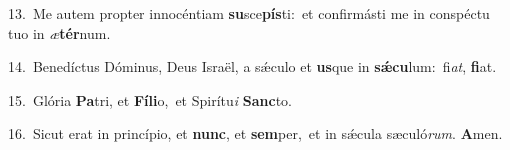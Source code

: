 {\numbfont\textcolor{\numbcolor}{13.}}~Me autem propter innocéntiam \textbf{su}\-sce\-\textbf{pís}\-ti:~\star et confirmásti me in conspéctu tuo in \textit{æ}\-\textbf{tér}num.\par
{\numbfont\textcolor{\numbcolor}{14.}}~Benedíctus Dóminus, Deus Israël, a sǽculo et \textbf{us}\-que in \textbf{sǽ}\-\textbf{cu}lum:~\star fi\-\textit{at}\-, \textbf{fi}\-at.\par
{\numbfont\textcolor{\numbcolor}{15.}}~Glória \textbf{Pa}\-tri, et \textbf{Fí}\-\textbf{li}o,~\star et Spirítu\textit{i} \textbf{Sanc}\-to.\par
{\numbfont\textcolor{\numbcolor}{16.}}~Sicut erat in princípio, et \textbf{nunc}\-, et \textbf{sem}\-per,~\star et in sǽcula sæculó\-\textit{rum}\-. \textbf{A}\-men.\par
